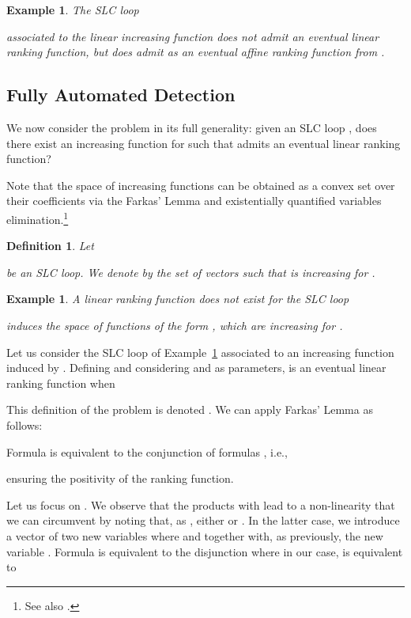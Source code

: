 \documentclass{acm_proc_article-sp}
\newtheorem{definition}[theorem]{Definition}
\newtheorem{example}[theorem]{Example}
\begin{document}
\begin{example}
\label{ex-fn-rng-aff-evt-p}
The SLC loop

associated to the linear increasing function 
does not admit an eventual linear ranking function, but does admit
 as an eventual affine ranking function from .
\end{example}



\subsection{Fully Automated Detection}
\label{sec:elrf-full-detection}

We now consider the problem in its full generality:
given an SLC loop , does there exist an increasing function for 
such that  admits an eventual linear ranking function?

Note that the space of increasing functions can be obtained
as a convex set over their coefficients
via the Farkas' Lemma and existentially quantified variables
elimination.\footnote{See also \cite[Section 4.4]{BagnaraMPZ12IC}.}

\begin{definition}
\label{def-inc}
Let

be an SLC loop.
We denote by  the set of vectors 
such that 
is increasing for .
\end{definition}

\begin{example}
\label{ex-full-detection}
A linear ranking function does not exist for the SLC loop 


induces the space of functions of the form ,
which are increasing for .
\end{example}

Let us consider the SLC loop of Example~\ref{ex-full-detection}
associated to an increasing function 
induced by .
Defining  and
considering  and  as parameters,
 is an eventual linear ranking function when

This definition of the problem is denoted .
We can apply Farkas' Lemma as follows:

Formula  is equivalent to the conjunction
of formulas , i.e.,

ensuring the positivity of the ranking function.

Let us focus on .
We observe that the products with 
lead to a non-linearity that we can circumvent
by noting that, as ,
either  or .
In the latter case, we introduce a vector  of
two new variables where
 and  together
with, as previously, the new variable .
Formula  is equivalent to the disjunction
 where
in our case,  is equivalent to
\end{document}
